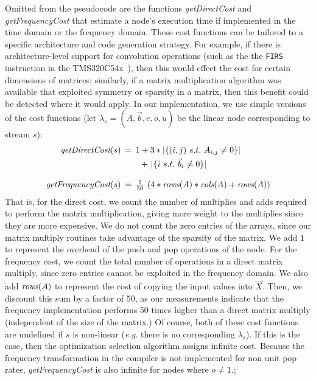 Omitted from the pseudocode are the functions {\it getDirectCost} 
and {\it getFrequencyCost} that estimate a node's
execution time if implemented in the time domain or the frequency
domain.  These cost functions can be tailored to a specific
architecture and code generation strategy.  For example, if there is
architecture-level support for convolution operations (such as 
the the {\tt FIRS} instruction in the TMS320C54x~\cite{ti-dsp-manual}), 
then this would effect the cost for certain dimensions of matrices; similarly, if a
matrix multiplication algorithm was available that exploited symmetry
or sparsity in a matrix, then this benefit could be detected where it
would apply.  In our implementation, we use simple versions of the
cost functions (let $\lambda_s=(A,\vec{b},e,o,u)$ be the linear node
corresponding to stream $s$):
\[
\begin{array}{rcl}
\mt{getDirectCost}(s) \hspace{-6pt} & = \hspace{-6pt} & 1 + 3 * |\{ (i,j)~s.t.~A_{i,j} \ne 0\}| \vspace{3pt} \\ 
 ~ & ~ & \hspace{6.8pt}+~|\{ i~s.t.~{\vec b}_i \ne 0 \}| \\ ~ & ~ & ~ \\
\mt{getFrequencyCost}(s)  \hspace{-6pt} & = \hspace{-6pt} & \frac{1}{50}~(4 * \mt{rows}(A) * \mt{cols}(A) + \mt{rows}(A))
\end{array}
\]
That is, for the direct cost, we count the number of multiplies and
adds required to perform the matrix multiplication, giving more weight
to the multiplies since they are more expensive.  We do not count the
zero entries of the arrays, since our matrix multiply routines take
advantage of the sparsity of the matrix.  We add $1$ to represent
the overhead of the push and pop operations of the node.  For the
frequency cost, we count the total number of operations in a direct
matrix multiply, since zero entries cannot be exploited in the
frequency domain.  We also add $\mbox{\it rows}(A)$ to represent the 
cost of copying the input values into $\vec{X}$. Then, we discount this sum
by a factor of 50, as our measurements indicate that the frequency
implementation performs 50 times higher than a direct matrix multiply
(independent of the size of the matrix.)  Of course, both of these
cost functions are undefined if $s$ is non-linear ({\it e.g.} there is no
corresponding $\lambda_s$). If this is the case, then
the optimization selection algorithm assigns infinite cost.
Because the frequency transformation in the compiler is not implemented for
non unit pop rates, {\it getFrequencyCost} is also infinite 
for nodes where $o \ne 1$.; 


